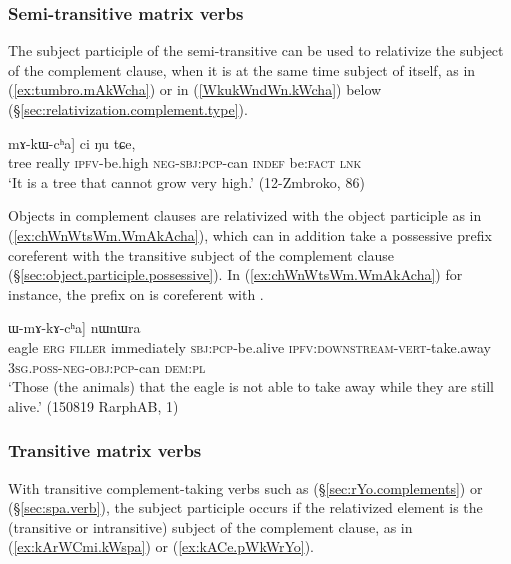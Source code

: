 \subsubsection{Semi-transitive matrix verbs} \label{sec:out.complement.relativization.cha}
The subject participle of the semi-transitive  can be used to relativize the subject of the complement clause, when it is at the same time subject of  itself, as in (\ref{ex:tumbro.mAkWcha}) or in (\ref{WkukWndWn.kWcha}) below (§\ref{sec:relativization.complement.type}).
 
\begin{exe}
\ex \label{ex:tumbro.mAkWcha}
\gll [\textbf{si} [wuma tu-mbro] mɤ-kɯ-cʰa] ci ŋu tɕe, \\
tree really \textsc{ipfv}-be.high \textsc{neg}-\textsc{sbj}:\textsc{pcp}-can \textsc{indef} be:\textsc{fact} \textsc{lnk} \\
\glt `It is a tree that cannot grow very high.' (12-Zmbroko, 86)
\end{exe}


Objects in complement clauses are relativized with the object participle  as in (\ref{ex:chWnWtsWm.WmAkAcha}), which can in addition take a possessive prefix coreferent with the transitive subject of the complement clause (§\ref{sec:object.participle.possessive}). In (\ref{ex:chWnWtsWm.WmAkAcha}) for instance, the prefix  on  is coreferent with .

\begin{exe}
\ex \label{ex:chWnWtsWm.WmAkAcha}
\gll [[qaliaʁ kɯ, nɤkinɯ, nɯɕimɯma kɯ-sɯsu cʰɯ-nɯ-tsɯm] ɯ-mɤ-kɤ-cʰa] nɯnɯra \\
eagle \textsc{erg} \textsc{filler} immediately \textsc{sbj}:\textsc{pcp}-be.alive \textsc{ipfv}:\textsc{downstream}-\textsc{vert}-take.away \textsc{3sg}.\textsc{poss}-\textsc{neg}-\textsc{obj}:\textsc{pcp}-can \textsc{dem}:\textsc{pl} \\
\glt `Those (the animals) that the eagle is not able to take away while they are still alive.' (150819 RarphAB, 1)
\end{exe}

\subsubsection{Transitive matrix verbs} \label{sec:out.complement.relativization.tr}
With transitive complement-taking verbs such as  (§\ref{sec:rYo.complements}) or  (§\ref{sec:spa.verb}), the subject participle occurs if the relativized element is the (transitive or intransitive) subject of the complement clause, as in (\ref{ex:kArWCmi.kWspa}) or (\ref{ex:kACe.pWkWrYo}).


